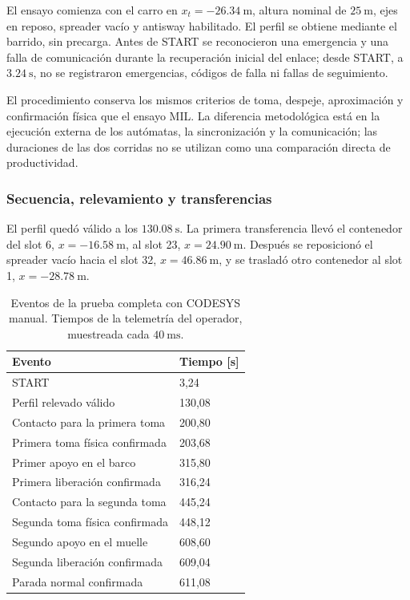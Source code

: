 \documentclass[a4paper,10pt,onecolumn,journal]{ieeeconf}
\numberwithin{equation}{section}
\begin{document}
El ensayo comienza con el carro en $x_t=-26.34~\mathrm{m}$, altura nominal de $25~\mathrm{m}$, ejes en reposo, spreader vacío y antisway habilitado. El perfil se obtiene mediante el barrido, sin precarga. Antes de START se reconocieron una emergencia y una falla de comunicación durante la recuperación inicial del enlace; desde START, a $3.24~\mathrm{s}$, no se registraron emergencias, códigos de falla ni fallas de seguimiento.

El procedimiento conserva los mismos criterios de toma, despeje, aproximación y confirmación física que el ensayo MIL. La diferencia metodológica está en la ejecución externa de los autómatas, la sincronización y la comunicación; las duraciones de las dos corridas no se utilizan como una comparación directa de productividad.


\subsubsection{Secuencia, relevamiento y transferencias}
El perfil quedó válido a los $130.08~\mathrm{s}$. La primera transferencia llevó el contenedor del slot 6, $x=-16.58~\mathrm{m}$, al slot 23, $x=24.90~\mathrm{m}$. Después se reposicionó el spreader vacío hacia el slot 32, $x=46.86~\mathrm{m}$, y se trasladó otro contenedor al slot 1, $x=-28.78~\mathrm{m}$.

\begin{table}[H]
\centering\small
\caption{Eventos de la prueba completa con CODESYS manual. Tiempos de la telemetría del operador, muestreada cada $40~\mathrm{ms}$.}
\label{tab:completa_codesys_eventos}
\begin{tabular}{L{.70\textwidth}C{.18\textwidth}}\toprule
Evento & Tiempo [s]\\\midrule
START & 3,24\\
Perfil relevado válido & 130,08\\
Contacto para la primera toma & 200,80\\
Primera toma física confirmada & 203,68\\
Primer apoyo en el barco & 315,80\\
Primera liberación confirmada & 316,24\\
Contacto para la segunda toma & 445,24\\
Segunda toma física confirmada & 448,12\\
Segundo apoyo en el muelle & 608,60\\
Segunda liberación confirmada & 609,04\\
Parada normal confirmada & 611,08\\\bottomrule
\end{tabular}
\end{table}
\end{document}
